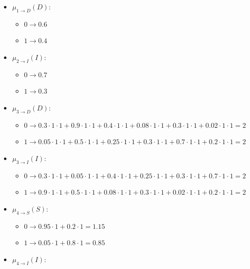 \begin{example}
    \begin{itemize}
        \item $\mu_{1 \rightarrow D}(D)$:
            \begin{itemize}
                \item $0 \rightarrow 0.6$
                \item $1 \rightarrow 0.4$
            \end{itemize}
        \item $\mu_{2 \rightarrow I}(I)$:
            \begin{itemize}
                \item $0 \rightarrow 0.7$
                \item $1 \rightarrow 0.3$
            \end{itemize}
        \item $\mu_{3 \rightarrow D}(D)$:
            \begin{itemize}
                \item $0 \rightarrow 0.3 \cdot 1 \cdot 1 + 0.9 \cdot 1 \cdot 1 + 0.4 \cdot 1 \cdot 1 + 0.08 \cdot 1 \cdot 1 + 0.3 \cdot 1 \cdot 1 + 0.02 \cdot 1 \cdot 1 = 2$
                \item $1 \rightarrow 0.05 \cdot 1 \cdot 1 + 0.5 \cdot 1 \cdot 1 + 0.25 \cdot 1 \cdot 1 + 0.3 \cdot 1 \cdot 1 + 0.7 \cdot 1 \cdot 1 + 0.2 \cdot 1 \cdot 1 = 2$
            \end{itemize}
        \item $\mu_{3 \rightarrow I}(I)$:
            \begin{itemize}
                \item $0 \rightarrow 0.3 \cdot 1 \cdot 1 + 0.05 \cdot 1 \cdot 1 + 0.4 \cdot 1 \cdot 1 + 0.25 \cdot 1 \cdot 1 + 0.3 \cdot 1 \cdot 1 + 0.7 \cdot 1 \cdot 1 =2$
                \item $1 \rightarrow 0.9 \cdot 1 \cdot 1 + 0.5 \cdot 1 \cdot 1 + 0.08 \cdot 1 \cdot 1 + 0.3 \cdot 1 \cdot 1 + 0.02 \cdot 1 \cdot 1 + 0.2 \cdot 1 \cdot 1 = 2$
            \end{itemize}
        \item $\mu_{4 \rightarrow S}(S)$: 
            \begin{itemize}
                \item $0 \rightarrow 0.95 \cdot 1 + 0.2 \cdot 1 = 1.15$
                \item $1 \rightarrow 0.05 \cdot 1 + 0.8 \cdot 1 = 0.85$
            \end{itemize}
        \item $\mu_{4 \rightarrow I}(I)$:

\end{itemize}
\end{example}

